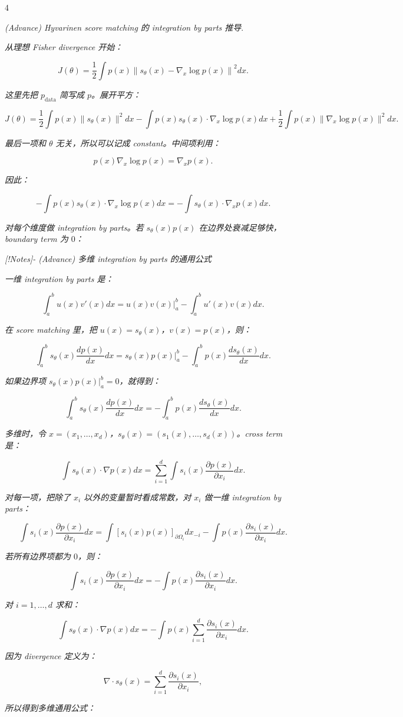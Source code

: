 \documentclass[8pt,a4paper,landscape]{extarticle}
\newcommand{\Body}[1]{{\tiny #1\par}}
\begin{document}
\begin{multicols*}{4}
\Body{\emph{(Advance) Hyvarinen score matching 的 integration by parts 推导}.}
\Body{\emph{从理想 Fisher divergence 开始：}}
\Body{\emph{}}
\[
J(\theta)
=
\frac{1}{2}
\int
p(x)
\left\|
s_\theta(x)-\nabla_x\log p(x)
\right\|^2
dx.
\]
\Body{\emph{}}
\Body{\emph{这里先把 $p_{\text{data}}$ 简写成 $p$。展开平方：}}
\Body{\emph{}}
\[
J(\theta)
=
\frac{1}{2}
\int p(x)\|s_\theta(x)\|^2dx
-
\int p(x)s_\theta(x)\cdot\nabla_x\log p(x)dx
+
\frac{1}{2}
\int p(x)\|\nabla_x\log p(x)\|^2dx.
\]
\Body{\emph{}}
\Body{\emph{最后一项和 $\theta$ 无关，所以可以记成 constant。中间项利用：}}
\Body{\emph{}}
\[
p(x)\nabla_x\log p(x)=\nabla_xp(x).
\]
\Body{\emph{}}
\Body{\emph{因此：}}
\Body{\emph{}}
\[
-
\int p(x)s_\theta(x)\cdot\nabla_x\log p(x)dx
=
-
\int s_\theta(x)\cdot\nabla_xp(x)dx.
\]
\Body{\emph{}}
\Body{\emph{对每个维度做 integration by parts。若 $s_\theta(x)p(x)$ 在边界处衰减足够快，boundary term 为 $0$：}}
\Body{\emph{}}
\Body{\emph{[!Notes]- (Advance) 多维 integration by parts 的通用公式}}
\Body{\emph{一维 integration by parts 是：}}
\Body{\emph{}}
\[
\int_a^b u(x)v'(x)dx
=
u(x)v(x)\big|_a^b
-
\int_a^b u'(x)v(x)dx.
\]
\Body{\emph{}}
\Body{\emph{在 score matching 里，把 $u(x)=s_\theta(x)$，$v(x)=p(x)$，则：}}
\Body{\emph{}}
\[
\int_a^b s_\theta(x)\frac{dp(x)}{dx}dx
=
s_\theta(x)p(x)\big|_a^b
-
\int_a^b p(x)\frac{ds_\theta(x)}{dx}dx.
\]
\Body{\emph{}}
\Body{\emph{如果边界项 $s_\theta(x)p(x)\big|_a^b=0$，就得到：}}
\Body{\emph{}}
\[
\int_a^b s_\theta(x)\frac{dp(x)}{dx}dx
=
-
\int_a^b p(x)\frac{ds_\theta(x)}{dx}dx.
\]
\Body{\emph{}}
\Body{\emph{多维时，令 $x=(x_1,\dots,x_d)$，$s_\theta(x)=(s_1(x),\dots,s_d(x))$。cross term 是：}}
\Body{\emph{}}
\[
\int s_\theta(x)\cdot\nabla p(x)dx
=
\sum_{i=1}^d
\int s_i(x)\frac{\partial p(x)}{\partial x_i}dx.
\]
\Body{\emph{}}
\Body{\emph{对每一项，把除了 $x_i$ 以外的变量暂时看成常数，对 $x_i$ 做一维 integration by parts：}}
\Body{\emph{}}
\[
\int s_i(x)\frac{\partial p(x)}{\partial x_i}dx
=
\int
\left[
s_i(x)p(x)
\right]_{\partial \Omega_i}
dx_{-i}
-
\int p(x)\frac{\partial s_i(x)}{\partial x_i}dx.
\]
\Body{\emph{}}
\Body{\emph{若所有边界项都为 $0$，则：}}
\Body{\emph{}}
\[
\int s_i(x)\frac{\partial p(x)}{\partial x_i}dx
=
-
\int p(x)\frac{\partial s_i(x)}{\partial x_i}dx.
\]
\Body{\emph{}}
\Body{\emph{对 $i=1,\dots,d$ 求和：}}
\Body{\emph{}}
\[
\int s_\theta(x)\cdot\nabla p(x)dx
=
-
\int p(x)
\sum_{i=1}^d
\frac{\partial s_i(x)}{\partial x_i}
dx.
\]
\Body{\emph{}}
\Body{\emph{因为 divergence 定义为：}}
\Body{\emph{}}
\[
\nabla\cdot s_\theta(x)
=
\sum_{i=1}^d
\frac{\partial s_i(x)}{\partial x_i},
\]
\Body{\emph{}}
\Body{\emph{所以得到多维通用公式：}}

\end{multicols*}
\end{document}
